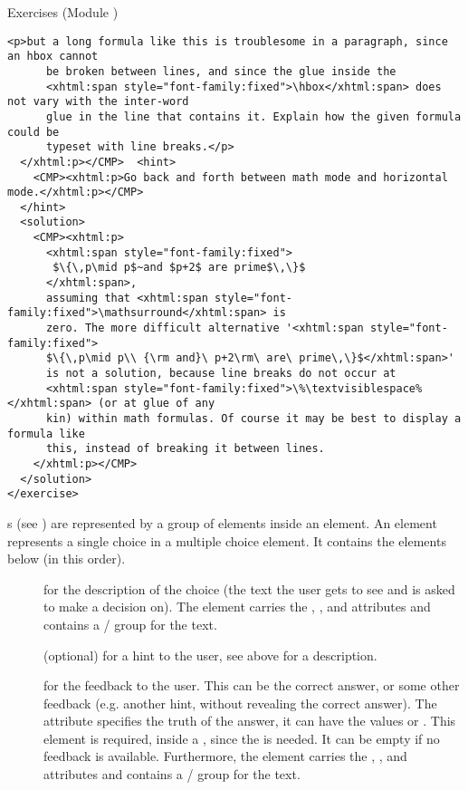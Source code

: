 \begin{tchapter}[id=quiz,short=Exercises]{Exercises (Module {})}
\begin{lstlisting}[label=lst:texbook-exercise,escapechar=\%,
  caption={An Exercise from the {\TeX}Book},
  index={exercise,hint,solution}]
    <p>but a long formula like this is troublesome in a paragraph, since an hbox cannot
      be broken between lines, and since the glue inside the 
      <xhtml:span style="font-family:fixed">\hbox</xhtml:span> does not vary with the inter-word
      glue in the line that contains it. Explain how the given formula could be
      typeset with line breaks.</p>
  </xhtml:p></CMP>  <hint>
    <CMP><xhtml:p>Go back and forth between math mode and horizontal mode.</xhtml:p></CMP>
  </hint>
  <solution>
    <CMP><xhtml:p>
      <xhtml:span style="font-family:fixed">
       $\{\,p\mid p$~and $p+2$ are prime$\,\}$
      </xhtml:span>,
      assuming that <xhtml:span style="font-family:fixed">\mathsurround</xhtml:span> is
      zero. The more difficult alternative '<xhtml:span style="font-family:fixed">
      $\{\,p\mid p\\ {\rm and}\ p+2\rm\ are\ prime\,\}$</xhtml:span>'
      is not a solution, because line breaks do not occur at 
      <xhtml:span style="font-family:fixed">\%\textvisiblespace%</xhtml:span> (or at glue of any
      kin) within math formulas. Of course it may be best to display a formula like
      this, instead of breaking it between lines.
    </xhtml:p></CMP>
  </solution>
</exercise>
\end{lstlisting}

{s} (see {}) are represented by a
group of {} elements inside an {} element.  An {}
element represents a single choice in a multiple choice element. It contains the elements
below (in this order).
\begin{description}
\item[{}] for the description of the choice (the text the user gets to see
  and is asked to make a decision on). The {} element carries the
  {}, {}, and
  {} attributes and contains a {}/{} group
  for the text.
\item[{}] (optional) for a hint to the user, see above for a description.
\item[{}] for the feedback to the user. This can be the correct answer, or
  some other feedback (e.g. another hint, without revealing the correct answer).  The
  {} attribute specifies the truth of the answer, it can have
  the values {} or {}. This
  element is required, inside a {}, since the {} is
  needed. It can be empty if no feedback is available. Furthermore, the {}
  element carries the {}, {}, and
  {} attributes and contains a {}/{} group
  for the text.
\end{description}


\end{tchapter}

